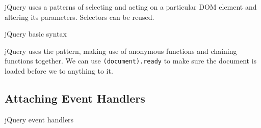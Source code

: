 jQuery uses a patterns of selecting and acting on a particular DOM element and altering its parameters.
Selectors can be reused.
\begin{highlight}{jQuery basic syntax}
\end{highlight}
jQuery uses the pattern, making use of anonymous functions and chaining functions together.
We can use \texttt{(document).ready} to make sure the document is loaded before we to anything to it.


\subsection{Attaching Event Handlers}\label{sub:attaching_event_handlers}

\begin{highlight}{jQuery event handlers}
\end{highlight}
